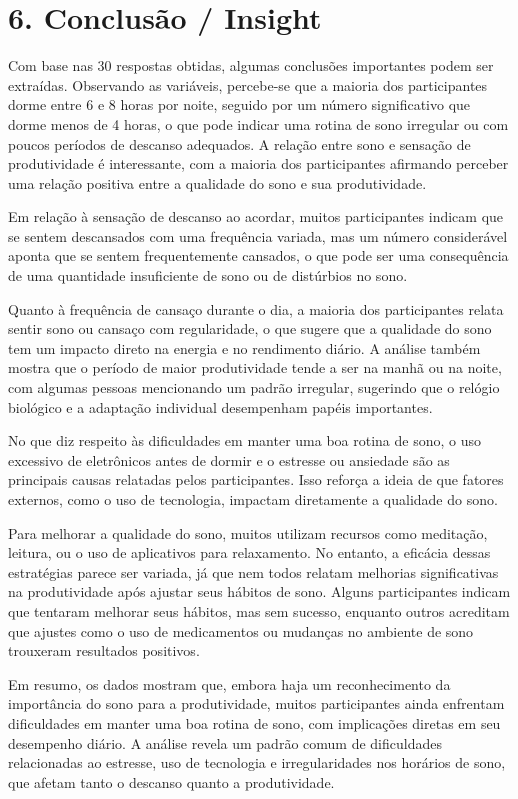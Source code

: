 \documentclass[12pt,a4paper]{article}
\begin{document}
\section*{6. Conclusão / Insight}
Com base nas 30 respostas obtidas, algumas conclusões importantes podem ser extraídas. Observando as variáveis, percebe-se que a maioria dos participantes dorme entre 6 e 8 horas por noite, seguido por um número significativo que dorme menos de 4 horas, o que pode indicar uma rotina de sono irregular ou com poucos períodos de descanso adequados. A relação entre sono e sensação de produtividade é interessante, com a maioria dos participantes afirmando perceber uma relação positiva entre a qualidade do sono e sua produtividade.

Em relação à sensação de descanso ao acordar, muitos participantes indicam que se sentem descansados com uma frequência variada, mas um número considerável aponta que se sentem frequentemente cansados, o que pode ser uma consequência de uma quantidade insuficiente de sono ou de distúrbios no sono.

Quanto à frequência de cansaço durante o dia, a maioria dos participantes relata sentir sono ou cansaço com regularidade, o que sugere que a qualidade do sono tem um impacto direto na energia e no rendimento diário. A análise também mostra que o período de maior produtividade tende a ser na manhã ou na noite, com algumas pessoas mencionando um padrão irregular, sugerindo que o relógio biológico e a adaptação individual desempenham papéis importantes.

No que diz respeito às dificuldades em manter uma boa rotina de sono, o uso excessivo de eletrônicos antes de dormir e o estresse ou ansiedade são as principais causas relatadas pelos participantes. Isso reforça a ideia de que fatores externos, como o uso de tecnologia, impactam diretamente a qualidade do sono.

Para melhorar a qualidade do sono, muitos utilizam recursos como meditação, leitura, ou o uso de aplicativos para relaxamento. No entanto, a eficácia dessas estratégias parece ser variada, já que nem todos relatam melhorias significativas na produtividade após ajustar seus hábitos de sono. Alguns participantes indicam que tentaram melhorar seus hábitos, mas sem sucesso, enquanto outros acreditam que ajustes como o uso de medicamentos ou mudanças no ambiente de sono trouxeram resultados positivos.

Em resumo, os dados mostram que, embora haja um reconhecimento da importância do sono para a produtividade, muitos participantes ainda enfrentam dificuldades em manter uma boa rotina de sono, com implicações diretas em seu desempenho diário. A análise revela um padrão comum de dificuldades relacionadas ao estresse, uso de tecnologia e irregularidades nos horários de sono, que afetam tanto o descanso quanto a produtividade.
\end{document}
